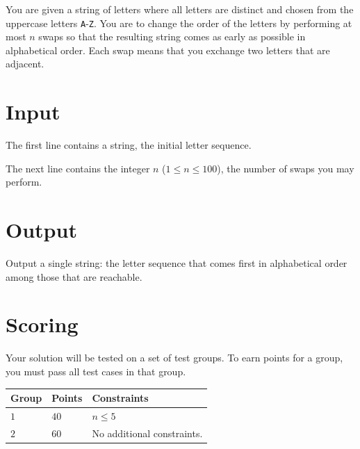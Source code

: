 
You are given a string of letters where all letters are distinct and chosen from the uppercase letters \texttt{A}-\texttt{Z}. You are to change the order of the letters by performing at most $n$ swaps so that the resulting string comes as early as possible in alphabetical order.
Each swap means that you exchange two letters that are adjacent.

\section*{Input}
The first line contains a string, the initial letter sequence.

The next line contains the integer $n$ ($1 \leq n \leq 100$), the number of swaps you may perform.

\section*{Output}
Output a single string: the letter sequence that comes first in alphabetical order among those that are reachable.

\section*{Scoring}
Your solution will be tested on a set of test groups.
To earn points for a group, you must pass all test cases in that group.


\noindent
\begin{tabular}{| l | l | p{12cm} |}
  \hline
  \textbf{Group} & \textbf{Points} & \textbf{Constraints} \\ \hline
  $1$    & $40$       & $n \leq 5$ \\ \hline
  $2$    & $60$       & No additional constraints. \\ \hline
\end{tabular}
